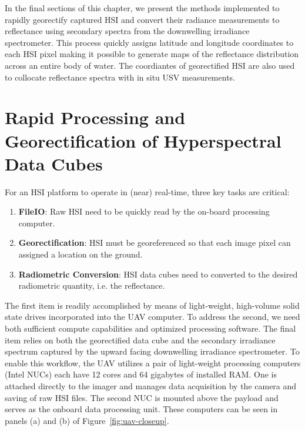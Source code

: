 In the final sections of this chapter, we present the methods implemented to
rapidly georectify captured HSI and convert their radiance measurements to
reflectance using secondary spectra from the downwelling irradiance
spectrometer. This process quickly assigns latitude and longitude coordinates to
each HSI pixel making it possible to generate maps of the reflectance
distribution across an entire body of water. The coordiantes of georectified HSI
are also used to collocate reflectance spectra with in situ USV measurements.



\section{Rapid Processing and Georectification of Hyperspectral Data Cubes}

For an HSI platform to operate in (near) real-time, three key tasks are critical:
\begin{enumerate}
\item \textbf{FileIO}: Raw HSI need to be quickly read by the on-board processing computer.
\item \textbf{Georectification}: HSI must be georeferenced so that each image
  pixel can assigned a location on the ground.
\item \textbf{Radiometric Conversion}: HSI data cubes need to converted to the
  desired radiometric quantity, i.e. the reflectance.
\end{enumerate}

The first item is readily accomplished by means of light-weight, high-volume
solid state drives incorporated into the UAV computer. To address the second, we
need both sufficient compute capabilities and optimized processing software. The
final item relies on both the georectified data cube and the secondary
irradiance spectrum captured by the upward facing downwelling irradiance
spectrometer. To enable this workflow, the UAV utilizes a pair of light-weight
processing computers (Intel NUCs) each have 12 cores and 64 gigabytes of
installed RAM.  One is attached directly to the imager and
manages data acquisition by the camera and saving of raw HSI files. The second
NUC is mounted above the payload and serves as the onboard data processing unit. These
computers can be seen in panels (a) and (b) of Figure~\ref{fig:uav-closeup}.


